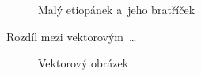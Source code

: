 \documentclass[a4paper,11pt, titlepage]{article}
\begin{document}
\begin{figure}[ht]
\begin{center}
{	 }
	\caption{Malý etiopánek a~jeho bratříček}
	\label{img1}
\end{center}
\end{figure}

\newpage

Rozdíl mezi vektorovým\, \ldots
\begin{figure}[ht]
\begin{center}
    \caption{Vektorový obrázek}
    \label{img2}
\end{center}
\end{figure}
\end{document}
